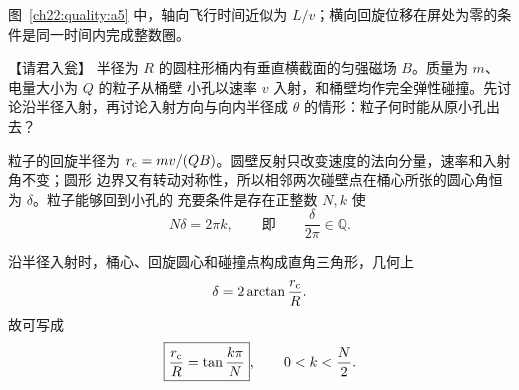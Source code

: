 {\begin{xesolution}
\begin{rTwoFigure}
\end{rTwoFigure}

图~\ref{ch22:quality:a5} 中，轴向飞行时间近似为 $L/v$；横向回旋位移在屏处为零的条件是同一时间内完成整数圈。
\end{xesolution}



\begin{origexamplebox}{【请君入瓮】}\label{ch22:ex:s38-7-6}
半径为 $R$ 的圆柱形桶内有垂直横截面的匀强磁场 $B$。质量为 $m$、电量大小为 $Q$ 的粒子从桶壁
小孔以速率 $v$ 入射，和桶壁均作完全弹性碰撞。先讨论沿半径入射，再讨论入射方向与向内半径成
$\theta$ 的情形：粒子何时能从原小孔出去？

\begin{center}
\end{center}
\end{origexamplebox}\par\nopagebreak[4]

\begin{xesolution}
粒子的回旋半径为 $r_{\rm c}=mv/(QB)$。圆壁反射只改变速度的法向分量，速率和入射角不变；圆形
边界又有转动对称性，所以相邻两次碰壁点在桶心所张的圆心角恒为 $\delta$。粒子能够回到小孔的
充要条件是存在正整数 $N,k$ 使
\begin{equation}
  N\delta=2\pi k,
  \qquad\text{即}\qquad \boxed{\frac{\delta}{2\pi}\in\mathbb Q}.
\end{equation}

沿半径入射时，桶心、回旋圆心和碰撞点构成直角三角形，几何上
\begin{equation}
  \delta=2\arctan\frac{r_{\rm c}}R.
\end{equation}
故可写成
\begin{equation}
  \boxed{\frac{r_{\rm c}}R=\tan\frac{k\pi}{N}},
  \qquad 0<k<\frac N2.
\end{equation}


\end{xesolution}}
